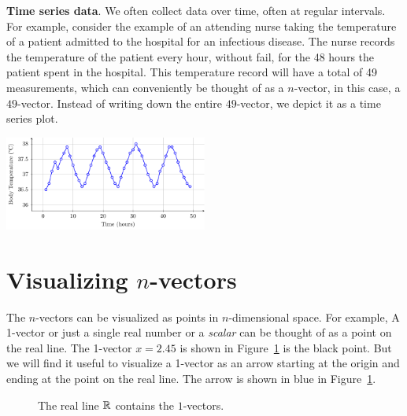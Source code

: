 \begin{boxedstuff}
    \begin{example}
        \textbf{Time series data}. We often collect data over time, often at regular intervals. For example, consider the example of an attending nurse taking the temperature of a patient admitted to the hospital for an infectious disease. The nurse records the temperature of the patient every hour, without fail, for the 48 hours the patient spent in the hospital. This temperature record will have a total of 49 measurements, which can conveniently be thought of as a $n$-vector, in this case, a $49$-vector. Instead of writing down the entire $49$-vector, we depict it as a time series plot.
        \begin{center}
            \includegraphics[width=0.5\textwidth]{figure/chapter01/temp-ts.pdf}
        \end{center}
    \end{example}
\end{boxedstuff}

\section{Visualizing $n$-vectors}
The $n$-vectors can be visualized as points in $n$-dimensional space. For example, A 1-vector or just a single real number or a \textit{scalar} can be thought of as a point on the real line. The 1-vector $x = 2.45$ is shown in Figure~\ref{fig:ch01-1-vector} is the black point. But we will find it useful to visualize a 1-vector as an arrow starting at the origin and ending at the point on the real line. The arrow is shown in blue in Figure~\ref{fig:ch01-1-vector}. 

\begin{figure}[b]
    \centering
    \caption{The real line $\mathbb{R}$ contains the $1$-vectors.}
    \label{fig:ch01-1-vector}
\end{figure}


